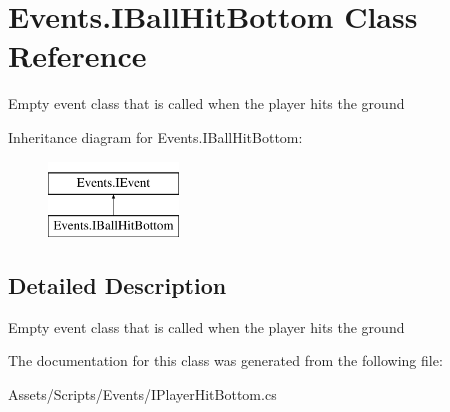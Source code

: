\hypertarget{class_events_1_1_i_ball_hit_bottom}{}\section{Events.\+I\+Ball\+Hit\+Bottom Class Reference}
\label{class_events_1_1_i_ball_hit_bottom}


Empty event class that is called when the player hits the ground  


Inheritance diagram for Events.\+I\+Ball\+Hit\+Bottom\+:\begin{figure}[H]
\begin{center}
\leavevmode
\includegraphics[height=2.000000cm]{class_events_1_1_i_ball_hit_bottom}
\end{center}
\end{figure}


\subsection{Detailed Description}
Empty event class that is called when the player hits the ground 



The documentation for this class was generated from the following file\+:\begin{DoxyCompactItemize}
\item 
Assets/\+Scripts/\+Events/I\+Player\+Hit\+Bottom.\+cs\end{DoxyCompactItemize}
